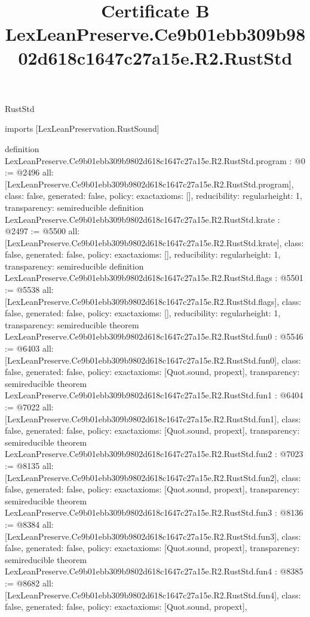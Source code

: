 \begin{lexlean}{RustStd}
\title{Certificate B LexLeanPreserve.Ce9b01ebb309b9802d618c1647c27a15e.R2.RustStd}
\begin{coremodule}
imports [LexLeanPreservation.RustSound]

definition LexLeanPreserve.Ce9b01ebb309b9802d618c1647c27a15e.R2.RustStd.program : @0 := @2496 {
  all: [LexLeanPreserve.Ce9b01ebb309b9802d618c1647c27a15e.R2.RustStd.program],
  class: false,
  generated: false,
  policy: exact{axioms: []},
  reducibility: regular{height: 1},
  transparency: semireducible
}
definition LexLeanPreserve.Ce9b01ebb309b9802d618c1647c27a15e.R2.RustStd.krate : @2497 := @5500 {
  all: [LexLeanPreserve.Ce9b01ebb309b9802d618c1647c27a15e.R2.RustStd.krate],
  class: false,
  generated: false,
  policy: exact{axioms: []},
  reducibility: regular{height: 1},
  transparency: semireducible
}
definition LexLeanPreserve.Ce9b01ebb309b9802d618c1647c27a15e.R2.RustStd.flags : @5501 := @5538 {
  all: [LexLeanPreserve.Ce9b01ebb309b9802d618c1647c27a15e.R2.RustStd.flags],
  class: false,
  generated: false,
  policy: exact{axioms: []},
  reducibility: regular{height: 1},
  transparency: semireducible
}
theorem LexLeanPreserve.Ce9b01ebb309b9802d618c1647c27a15e.R2.RustStd.fun0 : @5546 := @6403 {
  all: [LexLeanPreserve.Ce9b01ebb309b9802d618c1647c27a15e.R2.RustStd.fun0],
  class: false,
  generated: false,
  policy: exact{axioms: [Quot.sound, propext]},
  transparency: semireducible
}
theorem LexLeanPreserve.Ce9b01ebb309b9802d618c1647c27a15e.R2.RustStd.fun1 : @6404 := @7022 {
  all: [LexLeanPreserve.Ce9b01ebb309b9802d618c1647c27a15e.R2.RustStd.fun1],
  class: false,
  generated: false,
  policy: exact{axioms: [Quot.sound, propext]},
  transparency: semireducible
}
theorem LexLeanPreserve.Ce9b01ebb309b9802d618c1647c27a15e.R2.RustStd.fun2 : @7023 := @8135 {
  all: [LexLeanPreserve.Ce9b01ebb309b9802d618c1647c27a15e.R2.RustStd.fun2],
  class: false,
  generated: false,
  policy: exact{axioms: [Quot.sound, propext]},
  transparency: semireducible
}
theorem LexLeanPreserve.Ce9b01ebb309b9802d618c1647c27a15e.R2.RustStd.fun3 : @8136 := @8384 {
  all: [LexLeanPreserve.Ce9b01ebb309b9802d618c1647c27a15e.R2.RustStd.fun3],
  class: false,
  generated: false,
  policy: exact{axioms: [Quot.sound, propext]},
  transparency: semireducible
}
theorem LexLeanPreserve.Ce9b01ebb309b9802d618c1647c27a15e.R2.RustStd.fun4 : @8385 := @8682 {
  all: [LexLeanPreserve.Ce9b01ebb309b9802d618c1647c27a15e.R2.RustStd.fun4],
  class: false,
  generated: false,
  policy: exact{axioms: [Quot.sound, propext]},
}
\end{coremodule}
\end{lexlean}
